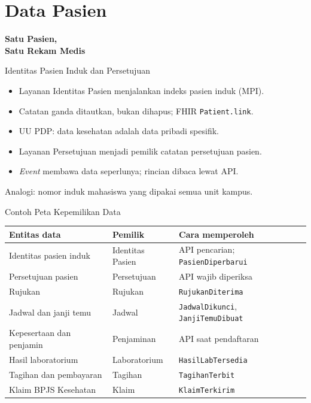 \documentclass[aspectratio=169, table, 12pt]{beamer}
\begin{document}
\section{Data Pasien}

\begin{frame}{\hfill}
  \centering
  \Huge{\textbf{Satu Pasien,\\Satu Rekam Medis}}
\end{frame}

\begin{frame}{{\Large Identitas Pasien Induk dan Persetujuan}}
  \vspace{6pt}
  \small
  \begin{itemize}
    \item Layanan Identitas Pasien menjalankan indeks pasien induk (MPI).
    \item Catatan ganda ditautkan, bukan dihapus; FHIR \texttt{Patient.link}.
    \item UU PDP: data kesehatan adalah data pribadi spesifik.
    \item Layanan Persetujuan menjadi pemilik catatan persetujuan pasien.
    \item \textit{Event} membawa data seperlunya; rincian dibaca lewat API.
  \end{itemize}
  \vspace{4pt}
  {\small Analogi: nomor induk mahasiswa yang dipakai semua unit kampus.}
\end{frame}

\begin{frame}{{\Large Contoh Peta Kepemilikan Data}}
  \footnotesize
  \begin{tabularx}{\textwidth}{>{\raggedright\arraybackslash}p{3.4cm}
      >{\raggedright\arraybackslash}p{2.6cm} >{\raggedright\arraybackslash}X}
    \hline
    \textbf{Entitas data} & \textbf{Pemilik} & \textbf{Cara memperoleh} \\
    \hline
    Identitas pasien induk & Identitas Pasien & API pencarian;
      \texttt{PasienDiperbarui} \\
    \hline
    Persetujuan pasien & Persetujuan & API wajib diperiksa \\
    \hline
    Rujukan & Rujukan & \texttt{RujukanDiterima} \\
    \hline
    Jadwal dan janji temu & Jadwal & \texttt{JadwalDikunci},
      \texttt{JanjiTemuDibuat} \\
    \hline
    Kepesertaan dan penjamin & Penjaminan & API saat pendaftaran \\
    \hline
    Hasil laboratorium & Laboratorium & \texttt{HasilLabTersedia} \\
    \hline
    Tagihan dan pembayaran & Tagihan & \texttt{TagihanTerbit} \\
    \hline
    Klaim BPJS Kesehatan & Klaim & \texttt{KlaimTerkirim} \\
    \hline
  \end{tabularx}
\end{frame}
\end{document}
